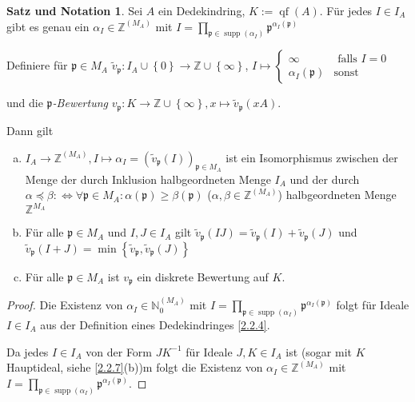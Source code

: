 \documentclass[
twoside=semi,
fontsize=12,
DIV=12, 
cleardoublepage=current,
leqno,
headings=optiontoheadandtoc, 
toc=idx
]{scrbook}
\newcommand{\N}{\mathbb{N}}
\newcommand{\Z}{\mathbb{Z}}
\newcommand{\set}[1]{\left\{ #1 \right\}}
\DeclareMathOperator{\supp}{supp}
\DeclareMathOperator{\qf}{qf}
\theoremstyle{definition}
\newtheorem{satz-not}[definition]{Satz und Notation}
\begin{document}
 	\begin{satz-not}\label{2.6.4}
 		Sei $A$ ein Dedekindring, $K:= \qf(A)$. F\"ur jedes $I \in I_A$ gibt es genau ein $\alpha_I \in \Z^{(M_A)}$ mit $I=\prod_{\mathfrak{p} \in \supp(\alpha_I)} \mathfrak{p}^{\alpha_I(\mathfrak{p})}$
 		
 		Definiere f\"ur $\mathfrak{p} \in M_A$ $\tilde{v}_\mathfrak{p}: I_A \cup \set{0} \to \Z \cup \set{\infty}$, $I \mapsto \begin{cases}
 			\infty & \textrm{ falls } I = 0\\
 			\alpha_I(\mathfrak{p}) & \textrm{sonst}
 		\end{cases}$
 	
 		und die \emph{$\mathfrak{p}$-Bewertung} $v_\mathfrak{p}: K \to \Z \cup \set{\infty}, x \mapsto \tilde{v}_\mathfrak{p}(xA)$.
 		
 		Dann gilt 
 		\begin{enumerate}[(a)]
 			\item 
 			$I_A \to \Z^{(M_A)}, I \mapsto \alpha_I = (\tilde{v}_\mathfrak{p}(I))_{\mathfrak{p} \in M_A}$ ist ein Isomorphismus zwischen der Menge der durch Inklusion halbgeordneten Menge $I_A$ und der durch
 			$\alpha \preceq \beta : \Leftrightarrow \forall \mathfrak{p} \in M_A: \alpha(\mathfrak{p}) \geq \beta(\mathfrak{p})$ ($\alpha, \beta \in \Z^{(M_A)}$) halbgeordneten Menge $\Z^{M_A}$
 			
 			\item
 			F\"ur alle $\mathfrak{p} \in M_A$ und $I, J \in I_A$ gilt $\tilde{v}_\mathfrak{p}(IJ) = \tilde{v}_\mathfrak{p}(I) + \tilde{v}_\mathfrak{p}(J)$ und $\tilde{v}_\mathfrak{p}(I+J) = \min \set{\tilde{v}_\mathfrak{p}, \tilde{v}_\mathfrak{p}(J)}$
 			
 			\item F\"ur alle $\mathfrak{p} \in M_A$ ist $v_\mathfrak{p}$ ein diskrete Bewertung auf $K$. 
 		\end{enumerate}
 	
 		\begin{proof}
 			Die Existenz von $\alpha_I \in \N_0^{(M_A)}$ mit $I = \prod_{\mathfrak{p} \in \supp(\alpha_I)} \mathfrak{p}^{\alpha_I(\mathfrak{p})}$ folgt f\"ur Ideale $I \in I_A$ aus der Definition eines Dedekindringes \ref{2.2.4}. 
 			
 			Da jedes $I \in I_A$ von der Form $JK^{-1}$ f\"ur Ideale $J,K \in I_A$ ist (sogar mit $K$ Hauptideal, siehe \ref{2.2.7}(b))m folgt die Existenz von $\alpha_I \in \Z^{(M_A)}$ mit $I = \prod_{\mathfrak{p} \in \supp(\alpha_I)} \mathfrak{p}^{\alpha_I(\mathfrak{p})}$.
 			

\end{proof}
\end{satz-not}
\end{document}
